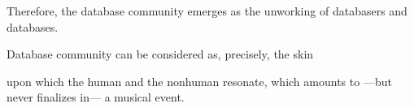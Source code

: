 
Therefore, the database community emerges as the unworking of databasers and databases. 

Database community can be considered as, precisely, the skin 

% 

upon which the human and the nonhuman resonate, which amounts to ---but never finalizes in--- a musical event.
